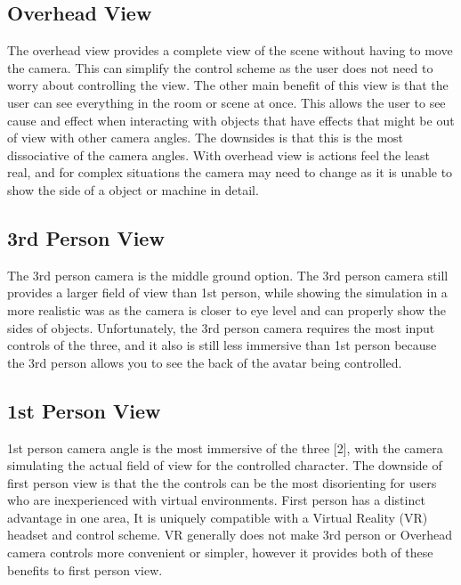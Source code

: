 \documentclass{article}
\begin{document}
\subsection{Overhead View}
The overhead view provides a complete view of the scene without having to move the camera. This can simplify the control scheme as the user does not need to worry about controlling the view. The other main benefit of this view is that the user can see everything in the room or scene at once. This allows the user to see cause and effect when interacting with objects that have effects that might be out of view with other camera angles. The downsides is that this is the most dissociative of the camera angles. With overhead view is actions feel the least real, and for complex situations the camera may need to change as it is unable to show the side of a object or machine in detail.

\subsection{3rd Person View}
The 3rd person camera is the middle ground option. The 3rd person camera still provides a larger field of view than 1st person, while showing the simulation in a more realistic was as the camera is closer to eye level and can properly show the sides of objects. Unfortunately, the 3rd person camera requires the most input controls of the three, and it also is still less immersive than 1st person because the 3rd person allows you to see the back of the avatar being controlled.  

\subsection{1st Person View}
1st person camera angle is the most immersive of the three [2], with the camera simulating the actual field of view for the controlled character. The downside of first person view is that the the controls can be the most disorienting for users who are inexperienced with virtual environments. First person has a distinct advantage in one area, It is uniquely compatible with a Virtual Reality (VR) headset and control scheme. VR generally does not make 3rd person or Overhead camera controls more convenient or simpler, however it provides both of these benefits to first person view. 
\end{document}
